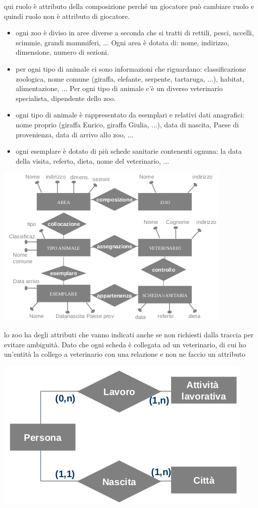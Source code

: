 \documentclass[a4paper,12pt, oneside]{book}
\begin{document}
qui ruolo è attributo della composizione perché un giocatore può cambiare ruolo e quindi ruolo non è attributo di giocatore.\\
\begin{esempio}
\begin{itemize}
\item ogni zoo è diviso in aree diverse a seconda che si tratti di rettili, pesci, uccelli, scimmie, grandi mammiferi, ... Ogni area è dotata di: nome,
indirizzo, dimensione, numero di sezioni.
\item per ogni tipo di animale ci sono informazioni che riguardano: classificazione zoologica, nome comune (giraffa, elefante, serpente,
tartaruga, ...), habitat, alimentazione, ... Per ogni tipo di animale c'è un diverso veterinario specialista, dipendente dello zoo.
\item ogni tipo di animale è rappresentato da esemplari e relativi dati anagrafici: nome proprio (giraffa Enrico, giraffa Giulia, ...), data di nascita,
Paese di provenienza, data di arrivo allo zoo, ...
\item ogni esemplare è dotato di più schede sanitarie contenenti ognuna: la data della visita, referto, dieta, nome del veterinario, ...

\end{itemize}
\begin{center}
\includegraphics[scale=0.8]{img/er3.png}
\end{center}
lo zoo ha degli attributi che vanno indicati anche se non richiesti dalla traccia per evitare ambiguità. Dato che ogni scheda è collegata ad un veterinario, di cui ho un'entità la collego a veterinario con una relazione e non ne faccio  un attributo
\end{esempio}
\begin{center}
\includegraphics[scale=0.8]{img/er4.png}
\end{center}
\end{document}
